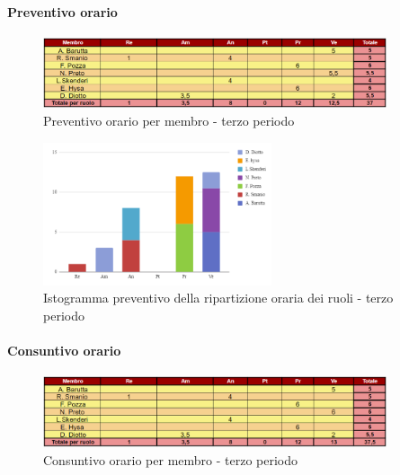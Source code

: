 \paragraph{Preventivo orario} \hspace{1pt}

\begin{figure}[H]
    \centering
    \includegraphics[width=0.9\textwidth]{../Images/preventivoOrario3Periodo.png}
    \caption{Preventivo orario per membro - terzo periodo}
    \label{fig:Preventivo_orario_3}
\end{figure}

\begin{figure}[H]
    \centering
    \includegraphics[width=0.6\textwidth]{../Images/preventivoDivisioneRuoli3Periodo.png}
    \caption{Istogramma preventivo della ripartizione oraria dei ruoli - terzo periodo}
    \label{fig:Preventivo_ripartizione_oraria_3}
\end{figure}

\paragraph{Consuntivo orario } \hspace{1pt}

\begin{figure}[H]
    \centering
    \includegraphics[width=0.9\textwidth]{../Images/consuntivoOrario3Periodo.png}
    \caption{Consuntivo orario per membro - terzo periodo}
    \label{fig:Constuntivo_orario_3}
\end{figure}

